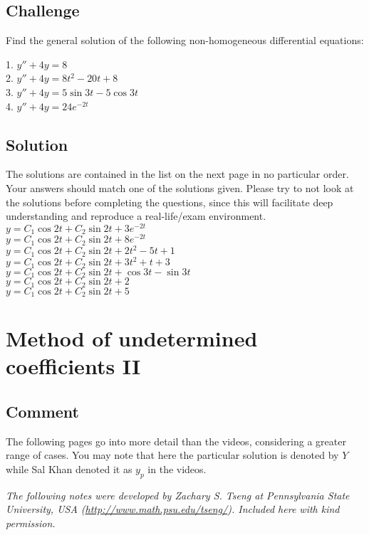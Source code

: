 \subsection*{Challenge}
Find the general solution of the following non-homogeneous differential equations:

1. $y'' + 4y = 8$\\
2. $y'' + 4y = 8t^2 - 20t + 8$\\
3. $y'' + 4y = 5 \sin 3t - 5 \cos 3t$\\
4. $y'' + 4y = 24 e^{-2t}$

\subsection*{Solution}
The solutions are contained in the list on the next page in no particular order. Your answers should match one of the solutions given. Please try to not look at the solutions before completing the questions, since this will facilitate deep understanding and reproduce a real-life/exam environment.
\newpage
$y = C_1 \cos 2t + C_2 \sin 2t + 3e^{-2t}$\\ %
$y = C_1 \cos 2t + C_2 \sin 2t + 8e^{-2t}$\\
$y = C_1 \cos 2t + C_2 \sin 2t + 2t^2 - 5t + 1$\\ %
$y = C_1 \cos 2t + C_2 \sin 2t + 3t^2 + t + 3$\\
$y = C_1 \cos 2t + C_2 \sin 2t + \cos 3t - \sin 3t$\\ %
$y = C_1 \cos 2t + C_2 \sin 2t + 2$\\ %
$y = C_1 \cos 2t + C_2 \sin 2t + 5$\\




\newpage
\section{Method of undetermined coefficients II}

\subsection*{Comment}
The following pages go into more detail than the videos, considering a greater range of cases. You may note that here the particular solution is denoted by $Y$ while Sal Khan denoted it as $y_p$ in the videos.

\emph{The following notes were developed by Zachary S. Tseng at Pennsylvania State University, USA (\url{http://www.math.psu.edu/tseng/}). Included here with kind permission.}

